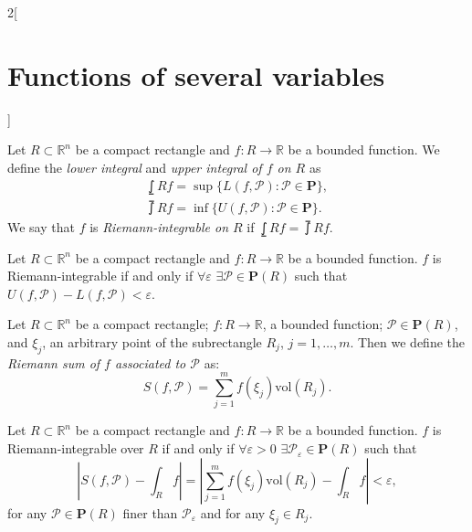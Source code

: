 \documentclass[class=article,10pt,crop=false]{standalone}
\begin{document}
\begin{multicols}{2}[\section{Functions of several variables}]
\begin{definition}
Let $R\subset\mathbb{R}^n$ be a compact rectangle and $f:R\rightarrow\mathbb{R}$ be a bounded function. We define the \textit{lower integral} and \textit{upper integral of $f$ on $R$} as 
\begin{gather*}
    \lowint{R}{}f=\sup\{L(f,\mathcal{P}):\mathcal{P}\in\textbf{P}\},\\
    \upint{R}{}f=\inf\{U(f,\mathcal{P}):\mathcal{P}\in\textbf{P}\}.
\end{gather*} We say that $f$ is \textit{Riemann-integrable on $R$} if $\displaystyle\lowint{R}{}f=\upint{R}{}f$.
\end{definition}
\begin{prop}
Let $R\subset\mathbb{R}^n$ be a compact rectangle and $f:R\rightarrow\mathbb{R}$ be a bounded function. $f$ is Riemann-integrable if and only if $\forall\varepsilon$ $\exists\mathcal{P}\in\textbf{P}(R)$ such that $U(f,\mathcal{P})-L(f,\mathcal{P})<\varepsilon$.
\end{prop}
\begin{definition}
Let $R\subset\mathbb{R}^n$ be a compact rectangle; $f:R\rightarrow\mathbb{R}$, a bounded function; $\mathcal{P}\in\textbf{P}(R)$, and $\xi_j$, an arbitrary point of the subrectangle $R_j$, $j=1,\ldots,m$. Then we define the \textit{Riemann sum of $f$ associated to $\mathcal{P}$} as: $$S(f,\mathcal{P})=\sum_{j=1}^mf(\xi_j)\text{vol}(R_j).$$
\end{definition}
\begin{theorem}
Let $R\subset\mathbb{R}^n$ be a compact rectangle and $f:R\rightarrow\mathbb{R}$ be a bounded function. $f$ is Riemann-integrable over $R$ if and only if $\forall\varepsilon>0$ $\exists\mathcal{P}_\varepsilon\in\textbf{P}(R)$ such that $$\left|S(f,\mathcal{P})-\int_Rf\right|=\left|\sum_{j=1}^mf(\xi_j)\text{vol}(R_j)-\int_Rf\right|<\varepsilon,$$ for any $\mathcal{P}\in\textbf{P}(R)$ finer than $\mathcal{P}_\varepsilon$ and for any $\xi_j\in R_j$.
\end{theorem}

\end{multicols}
\end{document}
